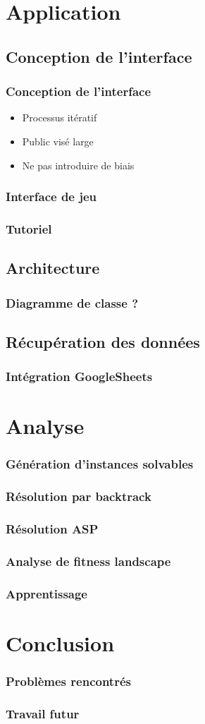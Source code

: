 \documentclass{beamer}
\begin{document}
\section{Application}
\subsection{Conception de l'interface}
\begin{frame}
\frametitle{Conception de l'interface}
\begin{itemize}
    \item Processus itératif
    \item Public visé large
    \item Ne pas introduire de biais 
\end{itemize}
\end{frame}
\begin{frame}
\frametitle{Interface de jeu}
\end{frame}

\begin{frame}
\frametitle{Tutoriel}
\end{frame}

\subsection{Architecture}
\begin{frame}
\frametitle{Diagramme de classe ?}
\end{frame}

\subsection{Récupération des données}
\begin{frame}
\frametitle{Intégration GoogleSheets}
\end{frame}

\section{Analyse}
\begin{frame}
\frametitle{Génération d'instances solvables}
\end{frame}

\begin{frame}
\frametitle{Résolution par backtrack}
\end{frame}

\begin{frame}
\frametitle{Résolution ASP}
\end{frame}

\begin{frame}
\frametitle{Analyse de fitness landscape}
\end{frame}

\begin{frame}
\frametitle{Apprentissage}
\end{frame}

\section{Conclusion}
\begin{frame}
\frametitle{Problèmes rencontrés}
\end{frame}

\begin{frame}
\frametitle{Travail futur}
\end{frame}
\end{document}
